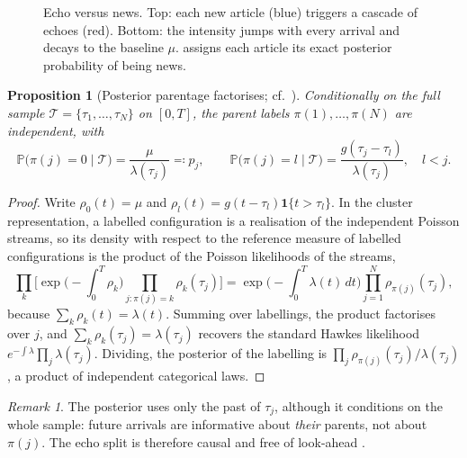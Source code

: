 \documentclass{article}
\theoremstyle{plain}
\newtheorem{proposition}[theorem]{Proposition}
\theoremstyle{definition}
\theoremstyle{remark}
\newtheorem{remark}[theorem]{Remark}
\newcommand{\Prob}{\mathbb{P}}
\newcommand{\ind}{\mathbf{1}}
\begin{document}
\begin{figure}[ht]
\caption{Echo versus news. Top: each new article (blue) triggers a cascade of echoes (red). Bottom: the intensity jumps with every arrival and decays to the baseline $\mu$.  assigns each article its exact posterior probability of being news.}
\label{fig:cascade}
\end{figure}
\begin{proposition}[Posterior parentage factorises; cf.\ \citealp{zhuang2002}]\label{prop:parentage}
Conditionally on the full sample $\mathcal{T}=\{\tau_1,\dots,\tau_N\}$ on $[0,T]$, the parent labels $\pi(1),\dots,\pi(N)$ are independent, with
\[
  \Prob\big(\pi(j)=0\mid\mathcal{T}\big)=\frac{\mu}{\lambda(\tau_j)}\eqqcolon p_j,\qquad
  \Prob\big(\pi(j)=l\mid\mathcal{T}\big)=\frac{g(\tau_j-\tau_l)}{\lambda(\tau_j)},\quad l<j .
\]
\end{proposition}
\begin{proof}
Write $\rho_0(t)=\mu$ and $\rho_l(t)=g(t-\tau_l)\ind\{t>\tau_l\}$. In the cluster representation, a labelled configuration is a realisation of the independent Poisson streams, so its density with respect to the reference measure of labelled configurations is the product of the Poisson likelihoods of the streams,
\[
  \prod_{k}\Big[\exp\Big(-\int_0^T\rho_k\Big)\prod_{j:\pi(j)=k}\rho_k(\tau_j)\Big]
  =\exp\Big(-\int_0^T\lambda(t)\,dt\Big)\prod_{j=1}^N\rho_{\pi(j)}(\tau_j),
\]
because $\sum_k\rho_k(t)=\lambda(t)$. Summing over labellings, the product factorises over $j$, and $\sum_k\rho_k(\tau_j)=\lambda(\tau_j)$ recovers the standard Hawkes likelihood $e^{-\int\lambda}\prod_j\lambda(\tau_j)$. Dividing, the posterior of the labelling is $\prod_j\rho_{\pi(j)}(\tau_j)/\lambda(\tau_j)$, a product of independent categorical laws.
\end{proof}
\begin{remark}
The posterior uses only the past of $\tau_j$, although it conditions on the whole sample: future arrivals are informative about \emph{their} parents, not about $\pi(j)$. The echo split is therefore causal and free of look-ahead \citep[cf.][]{zhuang2002}.
\end{remark}
\end{document}
